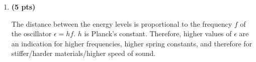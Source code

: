 \documentclass[11pt]{article}
\begin{document}
\begin{enumerate}[resume]
\item \textbf{(5 pts)} 


The distance between the energy levels is proportional to the frequency $f$ of the oscillator $\epsilon=hf$. $h$ is Planck's constant. Therefore, higher values of $\epsilon$ are an indication for higher frequencies, higher spring constants, and therefore for stiffer/harder materials/higher speed of sound. 

\end{enumerate}
\end{document}
